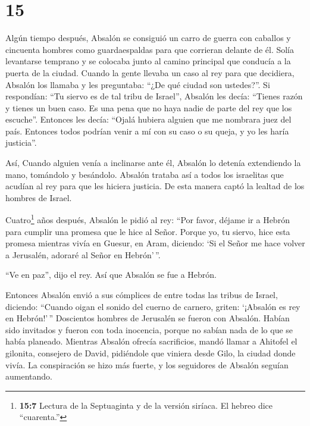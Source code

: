 \hypertarget{section-14}{%
\section{15}\label{section-14}}

 Algún tiempo después, Absalón se consiguió un carro de
guerra con caballos y cincuenta hombres como guardaespaldas para que
corrieran delante de él.  Solía levantarse temprano y se
colocaba junto al camino principal que conducía a la puerta de la
ciudad. Cuando la gente llevaba un caso al rey para que decidiera,
Absalón los llamaba y les preguntaba: ``¿De qué ciudad son ustedes?''.
Si respondían: ``Tu siervo es de tal tribu de Israel'', 
Absalón les decía: ``Tienes razón y tienes un buen caso. Es una pena que
no haya nadie de parte del rey que los escuche''.  Entonces
les decía: ``Ojalá hubiera alguien que me nombrara juez del país.
Entonces todos podrían venir a mí con su caso o su queja, y yo les haría
justicia''.

 Así, Cuando alguien venía a inclinarse ante él, Absalón lo
detenía extendiendo la mano, tomándolo y besándolo.  Absalón
trataba así a todos los israelitas que acudían al rey para que les
hiciera justicia. De esta manera captó la lealtad de los hombres de
Israel.

 Cuatro\footnote{\textbf{15:7} Lectura de la Septuaginta y
  de la versión siríaca. El hebreo dice ``cuarenta.''} años después,
Absalón le pidió al rey: ``Por favor, déjame ir a Hebrón para cumplir
una promesa que le hice al Señor.  Porque yo, tu siervo,
hice esta promesa mientras vivía en Guesur, en Aram, diciendo: `Si el
Señor me hace volver a Jerusalén, adoraré al Señor en Hebrón'\,''.

 ``Ve en paz'', dijo el rey. Así que Absalón se fue a
Hebrón.

 Entonces Absalón envió a sus cómplices de entre todas las
tribus de Israel, diciendo: ``Cuando oigan el sonido del cuerno de
carnero, griten: `¡Absalón es rey en Hebrón!'\,'' 
Doscientos hombres de Jerusalén se fueron con Absalón. Habían sido
invitados y fueron con toda inocencia, porque no sabían nada de lo que
se había planeado.  Mientras Absalón ofrecía sacrificios,
mandó llamar a Ahitofel el gilonita, consejero de David, pidiéndole que
viniera desde Gilo, la ciudad donde vivía. La conspiración se hizo más
fuerte, y los seguidores de Absalón seguían aumentando.

